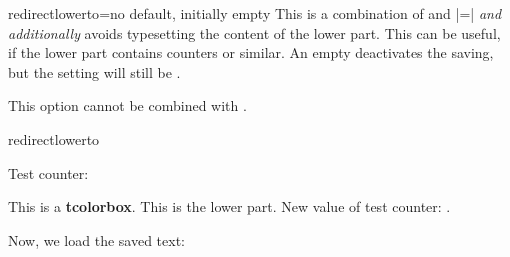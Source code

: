 \medskip

\begin{docTcbKey}[][doc new=2023-07-17]{redirectlowerto}{=}{no default, initially empty}
  This is a combination of  and |=|
  \emph{and additionally} avoids typesetting the content of the lower part.
  This can be useful, if the lower part contains counters or similar.
  An empty  deactivates the saving, but the 
  setting will still be .
  \begin{marker}
  This option cannot be combined with .
  \end{marker}
\begin{exdispExample}{redirectlowerto}

\setcounter{enumi}{1}
Test counter: \theenumi

\begin{tcolorbox}[redirectlowerto=\jobname_bspsave2.tex,colback=white]
This is a \textbf{tcolorbox}.
\tcblower
This is the lower part.
New value of test counter: \theenumi.
\end{tcolorbox}

Now, we load the saved text:\\

\end{exdispExample}
\end{docTcbKey}



